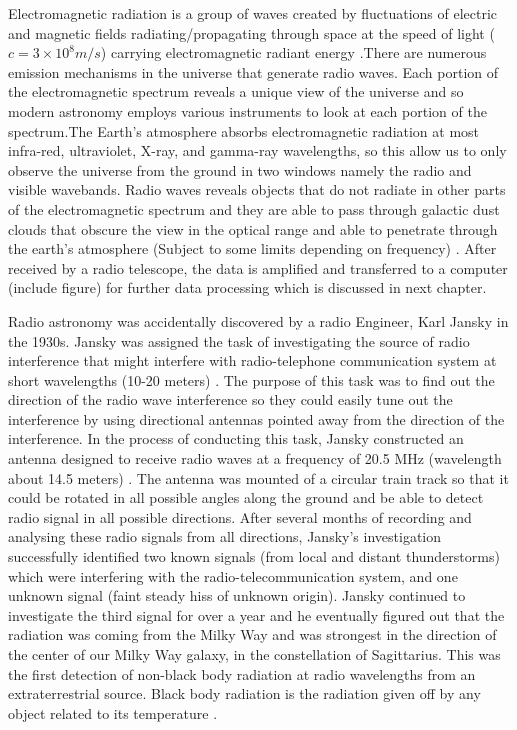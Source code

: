 Electromagnetic radiation is a group of waves created by fluctuations of electric and magnetic fields radiating/propagating through space at the speed of light ($c=3\times 10^{8} m/s$) carrying electromagnetic radiant energy \citep{staats2016genetic}.\;There are numerous emission mechanisms in the universe that generate radio waves.
Each portion of the electromagnetic spectrum reveals a unique view of the universe and so modern astronomy employs various instruments to look at each portion of the spectrum.\;The Earth's atmosphere absorbs electromagnetic radiation at most infra-red, ultraviolet, X-ray, and gamma-ray wavelengths, so this allow us to only observe the universe from the ground in two windows namely the radio and visible wavebands.  Radio waves reveals objects that do not radiate in other parts of the electromagnetic spectrum and they are able to pass through galactic dust clouds that obscure the view in the optical range and able to penetrate through the earth's atmosphere (Subject to some limits depending on frequency) \citep{thompson2001interferometry}. After received by a radio telescope, the data is amplified and transferred to a computer (include figure) for further  data processing which is discussed in next chapter.


Radio astronomy was accidentally discovered by a radio Engineer, Karl Jansky in the 1930s.
Jansky was assigned the task of investigating the source of radio interference that might interfere with radio-telephone communication system at short wavelengths (10-20 meters) \citep{verschuur2015invisible}.
The purpose of this task was to find out the direction of the radio wave interference so they could easily tune out the interference by using directional antennas pointed away from the direction of the interference. In the process of conducting this task, Jansky constructed an antenna designed to receive radio waves at a frequency of 20.5 MHz (wavelength about 14.5 meters) \citep{Jansky0}. The antenna was mounted of a circular train track so that it could be rotated in all possible angles along the ground and be able to detect radio signal in all possible directions. After several months of recording and analysing these radio signals from all directions, Jansky's investigation  successfully identified two known signals (from local and  distant thunderstorms) which were interfering with the radio-telecommunication system, and one unknown signal (faint steady hiss of unknown origin). Jansky continued to investigate the third signal for over a year and he eventually figured out that the radiation was coming from the Milky Way and was strongest in the direction of the center of our Milky Way
galaxy, in the constellation of Sagittarius. This was the first detection of non-black body radiation at radio wavelengths from an extraterrestrial source. Black body radiation is the radiation given off by any object
related to its temperature \citep{Jansky1}.

